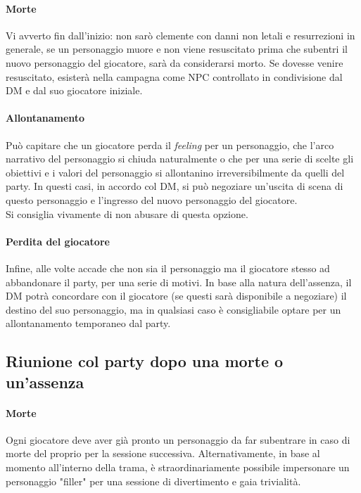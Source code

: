 \paragraph{Morte}

Vi avverto fin dall'inizio: non sarò clemente con danni non letali e resurrezioni in generale, se un personaggio muore e non viene resuscitato prima che subentri il nuovo personaggio del giocatore, sarà da considerarsi morto. Se dovesse venire resuscitato, esisterà nella campagna come NPC controllato in condivisione dal DM e dal suo giocatore iniziale.

\paragraph{Allontanamento}

Può capitare che un giocatore perda il \textit{feeling} per un personaggio, che l'arco narrativo del personaggio si chiuda naturalmente o che per una serie di scelte gli obiettivi e i valori del personaggio si allontanino irreversibilmente da quelli del party. In questi casi, in accordo col DM, si può negoziare un'uscita di scena di questo personaggio e l'ingresso del nuovo personaggio del giocatore.\\ Si consiglia vivamente di non abusare di questa opzione.

\paragraph{Perdita del giocatore}

Infine, alle volte accade che non sia il personaggio ma il giocatore stesso ad abbandonare il party, per una serie di motivi. In base alla natura dell'assenza, il DM potrà concordare con il giocatore (se questi sarà disponibile a negoziare) il destino del suo personaggio, ma in qualsiasi caso è consigliabile optare per un allontanamento temporaneo dal party.

\subsection{Riunione col party dopo una morte o un'assenza}

\paragraph{Morte}

Ogni giocatore deve aver già pronto un personaggio da far subentrare in caso di morte del proprio per la sessione successiva. Alternativamente, in base al momento all'interno della trama, è straordinariamente possibile impersonare un personaggio "filler" per una sessione di divertimento e gaia trivialità.

